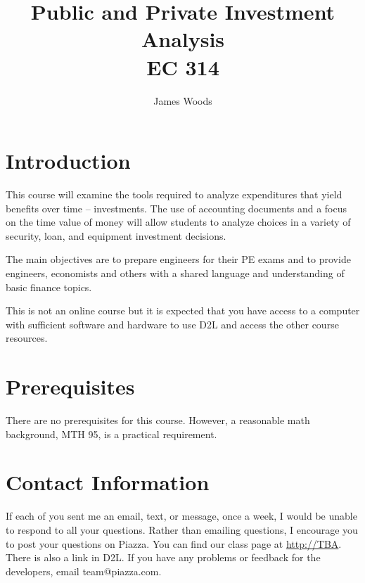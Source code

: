 \documentclass[letterpaper,10pt]{article}
\date{}
\title{Public and Private Investment Analysis\\  
EC 314\\
\Term}
\author{James Woods}
\newcommand{\Piazza}{\url{http://TBA}}
\begin{document}
  
\maketitle

\section{Introduction}

This course will examine the tools required to analyze expenditures
that yield benefits over time -- investments. The use of accounting
documents and a focus on the time value of money will allow students
to analyze choices in a variety of security, loan, and equipment
investment decisions.

The main objectives are to prepare engineers for their PE exams and to
provide engineers, economists and others with a shared language and
understanding of basic finance topics.


This is not an online course but it is expected that you have access to a
computer with sufficient software and hardware to use D2L and access the other course resources.


% 

\section{Prerequisites}

There are no prerequisites for this course. However, a reasonable math
background, MTH 95, is a practical requirement. 

\section{Contact Information}

If each of you sent me an email, text, or message, once a week, I would be unable to respond to all your questions.  Rather than emailing questions, I encourage you to post your questions on Piazza. You can find our class page at \Piazza.  There is also a link in D2L. If you have any problems or feedback for the developers, email team@piazza.com.
\end{document}
